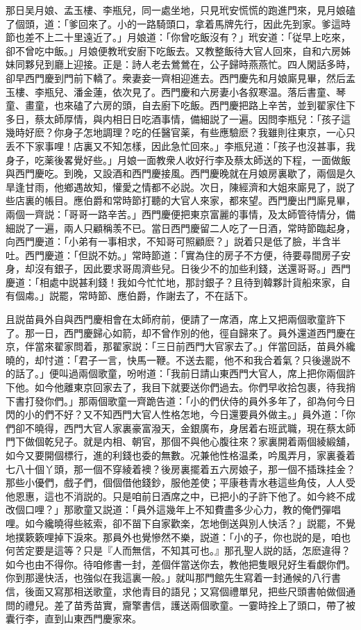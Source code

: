 那日吴月娘、孟玉樓、李瓶兒，同一處坐地，只見玳安慌慌的跑進門來，見月娘磕了個頭，道：「爹回來了。小的一路騎頭口，拿着馬牌先行，因此先到家。爹這時節也差不上二十里遠近了。」月娘道：「你曾吃飯沒有？」玳安道：「従早上吃來，卻不曾吃中飯。」月娘便教玳安廚下吃飯去。又教整飯待大官人回來，自和六房姊妹同夥兒到廳上迎接。正是：詩人老去鶯鶯在，公子歸時燕燕忙。四人閑話多時，卻早西門慶到門前下轎了。衆妻妾一齊相迎進去。西門慶先和月娘廝見畢，然后孟玉樓、李瓶兒、潘金蓮，依次見了。西門慶和六房妻小各叙寒温。落后書童、琴童、畫童，也來磕了六房的頭，自去廚下吃飯。西門慶把路上辛苦，並到翟家住下多日，蔡太師厚情，與内相日日吃酒事情，備細説了一遍。因問李瓶兒：「孩子這幾時好麽？你身子怎地調理？吃的任醫官薬，有些應驗麽？我雖則往東京，一心只丢不下家事哩！店裏又不知怎樣，因此急忙回來。」李瓶兒道：「孩子也沒甚事，我身子，吃薬後畧覺好些。」月娘一面教衆人收好行李及蔡太師送的下程，一面做飯與西門慶吃。到晚，又設酒和西門慶接風。西門慶晚就在月娘房裏歇了，兩個是久旱逢甘雨，他鄉遇故知，懽愛之情都不必説。次日，陳經濟和大姐來廝見了，説了些店裏的帳目。應伯爵和常時節打聽的大官人來家，都來望。西門慶出門廝見畢，兩個一齊説：「哥哥一路辛苦。」西門慶便把東京富麗的事情，及太師管待情分，備細説了一遍，兩人只顧稱羡不已。當日西門慶留二人吃了一日酒，常時節臨起身，向西門慶道：「小弟有一事相求，不知哥可照顧麽？」説着只是低了臉，半含半吐。西門慶道：「但説不妨。」常時節道：「實為住的房子不方便，待要尋間房子安身，却沒有銀子，因此要求哥周濟些兒。日後少不的加些利錢，送還哥哥。」西門慶道：「相處中説甚利錢！我如今忙忙地，那討銀子？且待到韓夥計貨船來家，自有個䖏。」説罷，常時節、應伯爵，作謝去了，不在話下。

且説苗員外自與西門慶相會在太師府前，便請了一席酒，席上又把兩個歌童許下了。那一日，西門慶歸心如箭，却不曾作別的他，徑自歸來了。員外還道西門慶在京，伴當來翟家問着，那翟家説：「三日前西門大官家去了。」伴當回話，苗員外纔曉的，却忖道：「君子一言，快馬一鞭。不送去罷，他不和我合着氣？只後邊説不的話了。」便叫過兩個歌童，吩咐道：「我前日請山東西門大官人，席上把你兩個許下他。如今他離東京回家去了，我目下就要送你們過去。你們早收拾包裹，待我捎下書打發你們。」那兩個歌童一齊跪告道：「小的們伏侍的員外多年了，卻為何今日閃的小的們不好？又不知西門大官人性格怎地，今日還要員外做主。」員外道：「你們卻不曉得，西門大官人家裏豪富潑天，金銀廣布，身居着右班武職，現在蔡太師門下做個乾兒子。就是内相、朝官，那個不與他心腹往來？家裏開着兩個綾緞舖，如今又要開個標行，進的利錢也委的無數。况兼他性格温柔，吟風弄月，家裏養着七八十個丫頭，那一個不穿綾着襖？後房裏擺着五六房娘子，那一個不插珠挂金？那些小優們，戲子們，個個借他錢鈔，服他差使；平康巷青水巷這些角伎，人人受他恩惠，這也不消説的。只是咱前日酒席之中，已把小的子許下他了。如今終不成改個口哩？」那歌童又説道：「員外這幾年上不知費盡多少心力，教的俺們彈唱哩。如今纔曉得些絃索，卻不㽞下自家歡楽，怎地倒送與別人快活？」説罷，不覺地撲簌簌哩掉下淚來。那員外也覺慘然不樂，説道：「小的子，你也説的是，咱也何苦定要是這等？只是『人而無信，不知其可也。』那孔聖人説的話，怎麽違得？如今也由不得你。待咱修書一封，差個伴當送你去，教他把隻眼兒好生看覷你們。你到那邊快活，也強似在我這裏一般。」就叫那門館先生寫着一封通候的八行書信，後面又寫那相送歌童，求他青目的語兒；又寫個禮單兒，把些尺頭書帕做個通問的禮兒。差了苗秀苗實，齎擎書信，護送兩個歌童。一霎時拴上了頭口，帶了被囊行李，直到山東西門慶家來。

